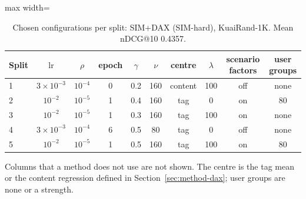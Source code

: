 \begin{table}[tbp]
\centering
\footnotesize
\caption{Chosen configurations per split: SIM+DAX (SIM-hard), KuaiRand-1K. Mean nDCG@10 0.4357.}
\label{tab:grid17}
\begin{adjustbox}{max width=\linewidth}
\begin{tabular}{lccccccccc}
\toprule
Split & $\mathrm{lr}$ & $\rho$ & epoch & $\gamma$ & $\nu$ & centre & $\lambda$ & scenario factors & user groups \\
\midrule
1 & $3\times10^{-3}$ & $10^{-4}$ & 0 & 0.2 & 160 & content & 100 & off & none \\
2 & $10^{-2}$ & $10^{-5}$ & 1 & 0.4 & 160 & tag & 0 & on & 80 \\
3 & $10^{-2}$ & $10^{-5}$ & 1 & 0.3 & 160 & tag & 100 & on & none \\
4 & $3\times10^{-3}$ & $10^{-4}$ & 6 & 0.5 & 80 & tag & 0 & off & none \\
5 & $10^{-2}$ & $10^{-5}$ & 1 & 0.5 & 160 & tag & 100 & on & 80 \\
\bottomrule
\end{tabular}
\end{adjustbox}
\par\smallskip
\begin{minipage}{\linewidth}\raggedright\footnotesize Columns that a method does not use are not shown. The centre is the tag mean or the content regression defined in Section~\ref{sec:method-dax}; user groups are none or a strength.\end{minipage}
\end{table}
